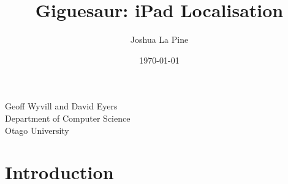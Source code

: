 \documentclass{article}
\title{Giguesaur: iPad Localisation} %
\author{Joshua La Pine} %
\date{\today} %
\begin{document}
\maketitle %

\begin{center}
\large {Geoff Wyvill and David Eyers}\\
\vspace*{1\baselineskip}
Department of Computer Science \\
Otago University \\

\end{center}
\newpage

\tableofcontents
\newpage

\begin{comment}
First pass list of left over comments
- David disagrees with the practicality of a classroom of kids working on a signular puzzle.
- Figure for rvec and tvec in background section. 
- what is localisation -> "Although the figure below doesn't show the orientation of the board as seen by a particular game player."
- maybe come back to the ar section. Put reference in for the uniqueness of giguesaur
- Come back to the section describing the generation of the world-space coordinate vector
- "On the OpenCV Github" -> Wat da faq?
- 
\end{comment}




\section{Introduction}

\end{document}
